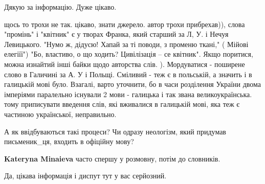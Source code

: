 \begin{itemize}
 
Дякую за інформацію. Дуже цікаво.

 

щось то трохи не так. цікаво, знати джерело. автор трохи прибрехав)), слова
"промінь" і "квітник" є у творах Франка, який старший за Л, У. і Нечуя
Левицького. "Нумо ж, дідусю! Хапай за ті поводи, з променю ткані," ( Мійові
елегіїї") "Бо, властиво, о що ходить? Цивілізація – се квітник". Якщо поритися,
можна изнайтий інші байки щодо авторства слів. ). Мордуватися - поширене слово
в Галичині за А. У і Польщі. Сміливий - теж є в польській, а значить і в
галицькій мові було. Взагалі, варто уточнити, бо в часи розділення України
двома імперіями паралельно існували 2 мови - галицька і так звана
великоукраїнська. тому приписувати введення слів, які вживалися в галицькій
мові, яка теж є частиною української, неправильно.


 
А як ввідбуваються такі процеси? Чи одразу неологізм, який придумав письменик_ця, входить в офіційну мову?

\begin{itemize}
 
\textbf{Kateryna Minaieva} часто спершу у розмовну, потім до словників.
\end{itemize}

 
Да, цікава інформація і диспут тут у вас серйозний.

\end{itemize}


